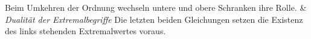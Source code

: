 \begin{BandUebersicht}
Beim Umkehren der Ordnung wechseln untere und obere Schranken ihre Rolle.
&
\textit{Dualität der Extremalbegriffe}
Die letzten beiden Gleichungen setzen die Existenz des links
stehenden Extremalwertes voraus.
\\
\end{BandUebersicht}
